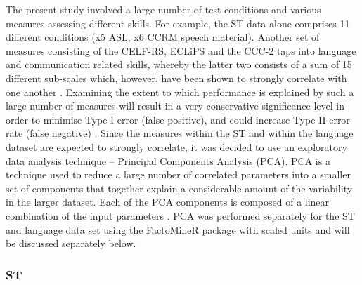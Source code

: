 \documentclass[a4paper, twoside]{templates/ociamthesis}
\begin{document}
The present study involved a large number of test conditions and various measures assessing different skills. For example, the ST data alone comprises 11 different conditions (x5 ASL, x6 CCRM speech material). Another set of measures consisting of the CELF-RS, ECLiPS and the CCC-2 taps into language and communication related skills, whereby the latter two consists of a sum of 15 different sub-scales which, however, have been shown to strongly correlate with one another \autocite{Barry2014}. Examining the extent to which performance is explained by such a large number of measures will result in a very conservative significance level in order to minimise Type-I error (false positive), and could increase Type II error rate (false negative) \autocite{McDonald2014}. Since the measures within the ST and within the language dataset are expected to strongly correlate, it was decided to use an exploratory data analysis technique -- Principal Components Analysis (PCA). PCA is a technique used to reduce a large number of correlated parameters into a smaller set of components that together explain a considerable amount of the variability in the larger dataset. Each of the PCA components is composed of a linear combination of the input parameters \autocite{JamesGareth2013}. PCA was performed separately for the ST and language data set using the FactoMineR package \autocite{Le2008} with scaled units and will be discussed separately below.

\hypertarget{st-1}{%
\subsubsection{ST}\label{st-1}}
\end{document}
